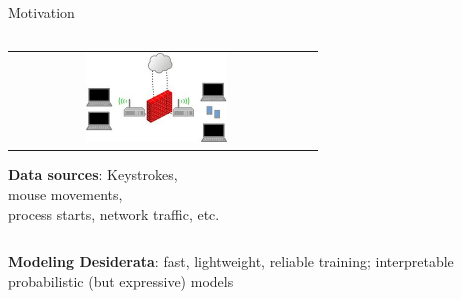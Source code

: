 \documentclass[10pt]{beamer}
\begin{document}
\begin{frame}{Motivation}
\begin{columns}[c,onlytextwidth]
\begin{column}{0.48\textwidth}
\begin{tabular}{cc}
  \includegraphics[width=0.5\textwidth]{images/network_traffic} 	
	  \end{tabular}
		\textbf{Data sources}: Keystrokes, \\
		mouse movements, \\ process starts, network traffic, etc.
    \end{column}
 \end{columns} 
 \pause 
 \vfill 
 \vfill 
 \textbf{Modeling Desiderata}: fast, lightweight, reliable training; interpretable probabilistic (but expressive) models 
\end{frame}
\end{document}
